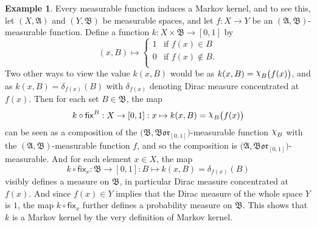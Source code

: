 \documentclass[
twoside=true,
paper=letter,
fontsize=9pt,
pagesize=auto,
leqno,
openany,
headsepline,
overfullrule,
]{scrbook}
\theoremstyle{plain}
\theoremstyle{plain}
\theoremstyle{definition}
\newtheorem{example}[thm]{Example}
\theoremstyle{bfnoteitalic}
\theoremstyle{bfnoteroman}
\newcommand{\sigalg}[1]{\mathfrak{#1}}
\newcommand{\sfop}[1]{\mathsf{#1}}
\newcommand{\borel}{\mathfrak{Bor}}
\newcommand{\charfunction}[1]{{\raisebox{2pt}{$\chi$}}_{#1}}
\newcommand{\sigmaalgebra}{\sigalg{A}}
\newcommand{\sigmaalgebraii}{\sigalg{B}}
\newcommand{\function}{f}
\newcommand{\measurespace}{X}
\newcommand{\measurespaceii}{Y}
\newcommand{\mspaceelt}{x}
\newcommand{\diracmeasure}[1]{\delta_{#1}}
\newcommand{\setii}{B}
\newcommand{\markovkernel}{k}
\newcommand{\fixinthefirst}[1]{\sfop{fix}_{#1}}
\newcommand{\fixinthesecond}[1]{\sfop{fix}^{#1}}
\begin{document}
\begin{example}
Every measurable function induces a Markov kernel, and to see this, let
$(\measurespace, \sigmaalgebra)$ and 
$(\measurespaceii, \sigmaalgebraii)$ be measurable spaces, and let 
$\function: \measurespace \to \measurespaceii$ be an $(\sigmaalgebra, \sigmaalgebraii)$\hyp{}measurable function. 
Define a function $\markovkernel:\measurespace\times\sigmaalgebraii\to [0,1]$ by
\[
(\mspaceelt,\setii) \mapsto
\begin{cases}
1 & \text{if $\function(\mspaceelt) \in\setii$} \\
0 & \text{if $\function(\mspaceelt) \notin\setii$.} \\
\end{cases}
\]
Two other ways to view the value $\markovkernel(\mspaceelt, \setii)$ would be as 
$\markovkernel(\mspaceelt, \setii)
= 
\charfunction{\setii}\bigl(\function(\mspaceelt)\bigr)$,
and as
$\markovkernel(\mspaceelt, \setii)
=
\diracmeasure{\function(\mspaceelt)}(\setii)$ with 
$\diracmeasure{\function(\mspaceelt)}$ denoting Dirac measure concentrated at 
$\function(\mspaceelt)$.
Then for each set $\setii\in\sigmaalgebraii$, the map
\[
\markovkernel\circ\fixinthesecond{\setii}
: \measurespace\to [0,1]
: \mspaceelt\mapsto \markovkernel(\mspaceelt, \setii)
= 
\charfunction{\setii}\bigl(\function(\mspaceelt)\bigr)
\]
can be seen as a composition of the 
$\bigl(\sigmaalgebraii, \borel_{[0,1]}\bigr)$\hyp{}measurable function $\charfunction{\setii}$ with the 
$(\sigmaalgebra, \sigmaalgebraii)$\hyp{}measurable function 
$\function$, and so the composition is 
$\bigl(\sigmaalgebra, \borel_{[0,1]}\bigr)$\hyp{}measurable.
And for each element
$\mspaceelt\in\measurespace$,  the map
\[
\markovkernel\circ\fixinthefirst{\mspaceelt}
: \sigmaalgebraii\to [0,1]
: \setii\mapsto \markovkernel(\mspaceelt, \setii)
= 
\diracmeasure{\function(\mspaceelt)}(\setii)
\]
visibly defines a measure on
$\sigmaalgebraii$, in particular Dirac measure concentrated at 
$\function(\mspaceelt)$.  And since $\function(\mspaceelt)\in\measurespaceii$ implies that the Dirac measure of the whole space $\measurespaceii$ is $1$, the map 
$\markovkernel\circ\fixinthefirst{\mspaceelt}$ further defines a probability measure on
$\sigmaalgebraii$. 
This shows that $\markovkernel$ is a Markov kernel by the very definition of Markov kernel.
\end{example}
\end{document}
